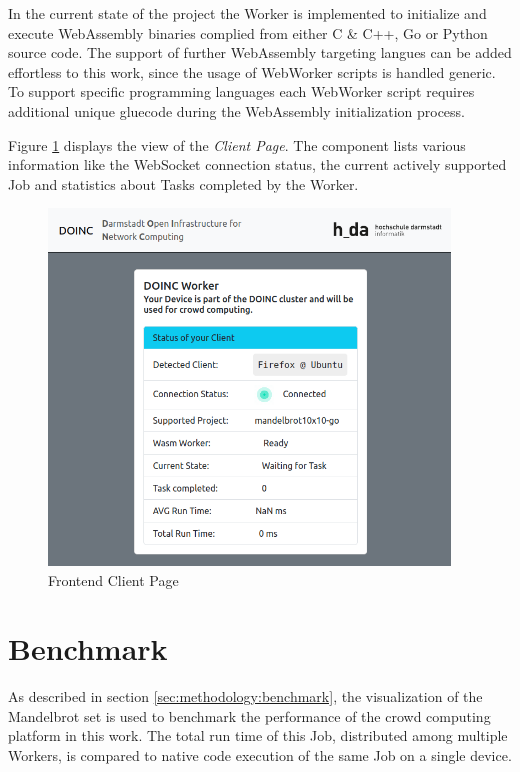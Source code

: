In the current state of the project the Worker is implemented to initialize and execute WebAssembly binaries complied from either C \& C++, Go or Python source code. The support of further WebAssembly targeting langues can be added effortless to this work, since the usage of WebWorker scripts is handled generic. To support specific programming languages each WebWorker script requires additional unique gluecode during the WebAssembly initialization process.

Figure \ref{fig:implementation:client-page} displays the view of the \emph{Client Page}. The component lists various information like the WebSocket connection status, the current actively supported Job and statistics about Tasks completed by the Worker.

\clearpage
\begin{figure}[htbp]
    \centering
    \includegraphics[width=0.95\textwidth]{gfx/figures/client-page.png}
    \caption{Frontend Client Page}
    \label{fig:implementation:client-page}
\end{figure}

\section{Benchmark}
\label{sec:implementation:benchmark}
As described in section \ref{sec:methodology:benchmark}, the visualization of the Mandelbrot set is used to benchmark the performance of the crowd computing platform in this work. The total run time of this Job, distributed among multiple Workers, is compared to native code execution of the same Job on a single device.

